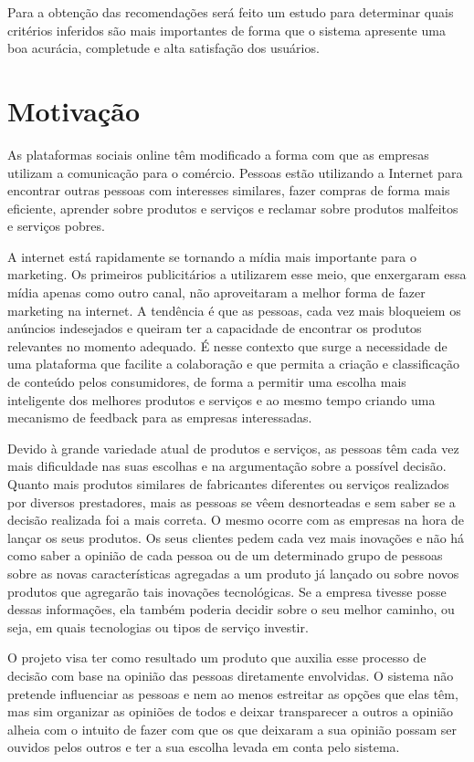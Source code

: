 	Para a obtenção das recomendações será feito um estudo para determinar quais critérios inferidos são mais importantes de forma que o sistema apresente uma boa acurácia, completude e alta satisfação dos usuários.

\section{Motivação}

 As plataformas sociais online têm modificado a forma com que as empresas utilizam a comunicação para o comércio. Pessoas estão utilizando a Internet para encontrar outras pessoas com interesses similares, fazer compras de forma mais eficiente, aprender sobre produtos e serviços e reclamar sobre produtos malfeitos e serviços pobres\cite{marketing_social_web}.
 
    A internet está rapidamente se tornando a mídia mais importante para o marketing. Os primeiros publicitários a utilizarem esse meio, que enxergaram essa mídia apenas como outro canal, não aproveitaram a melhor forma de fazer marketing na internet. A tendência é que as pessoas, cada vez mais bloqueiem os anúncios indesejados e queiram ter a capacidade de encontrar os produtos relevantes no momento adequado. É nesse contexto que surge a necessidade de uma plataforma que facilite a colaboração e que permita a criação e classificação de conteúdo pelos consumidores, de forma a permitir uma escolha mais inteligente dos melhores produtos e serviços e ao mesmo tempo criando uma mecanismo de feedback para as empresas interessadas.
 
    Devido à grande variedade atual de produtos e serviços, as pessoas têm cada vez mais dificuldade nas suas escolhas e na argumentação sobre a possível decisão. Quanto mais produtos similares de fabricantes diferentes ou serviços realizados por diversos prestadores, mais as pessoas se vêem desnorteadas e sem saber se a decisão realizada foi a mais correta. O mesmo ocorre com as empresas na hora de lançar os seus produtos. Os seus clientes pedem cada vez mais inovações e não há como saber a opinião de cada pessoa ou de um determinado grupo de pessoas sobre as novas características agregadas a um produto já lançado ou sobre novos produtos que agregarão tais inovações tecnológicas. Se a empresa tivesse posse dessas informações, ela também poderia decidir sobre o seu melhor caminho, ou seja, em quais tecnologias ou tipos de serviço investir.
 
    O projeto visa ter como resultado um produto que auxilia esse processo de decisão com base na opinião das pessoas diretamente envolvidas. O sistema não pretende influenciar as pessoas e nem ao menos estreitar as opções que elas têm, mas sim organizar as opiniões de todos e deixar transparecer a outros a opinião alheia com o intuito de fazer com que os que deixaram a sua opinião possam ser ouvidos pelos outros e ter a sua escolha levada em conta pelo sistema.


